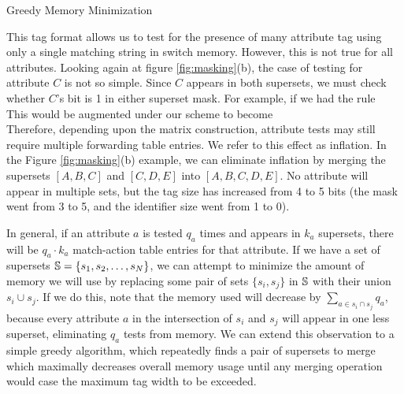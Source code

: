 \begin{algorithm}
\DontPrintSemicolon
{}
\caption{Greedy Memory Minimization\label{alg:memory_min}}
\end{algorithm}




This tag format allows us to test for the presence of many attribute tag using
only a single matching string in switch memory.  However, this is not true for
all attributes. Looking again at figure \ref{fig:masking}(b), the case of
testing for attribute $C$ is not so simple. Since $C$ appears in both supersets,
we must check whether $C$'s bit is 1 in either superset mask. For example, if we
had the rule\\ 
This would be augmented under our scheme to
become\\ 
Therefore, depending upon the matrix
construction, attribute tests may still require multiple forwarding table
entries. We refer to this effect as inflation. In the Figure
\ref{fig:masking}(b) example, we can eliminate inflation by merging the
supersets $[A,B,C]$ and $[C,D,E]$ into $[A,B,C,D,E]$. No attribute will appear
in multiple sets, but the tag size has increased from 4 to 5 bits (the mask went
from 3 to 5, and the identifier size went from 1 to 0).

In general, if an attribute $a$ is tested $q_a$ times and appears in $k_a$
supersets, there will be $q_a\cdot k_a$ match-action table entries for that
attribute. If we have a set of supersets $\mathbb{S} = \{s_1, s_2, \dots, s_N\}$, we
can attempt to minimize the amount of memory we will use by replacing some pair
of sets $\{s_i, s_j\}$ in $\mathbb{S}$ with their union $s_i\cup s_j$. If we do this,
note that the memory used will decrease by $\sum_{a \in s_i\cap s_j}q_a$,
because every attribute $a$ in the intersection of $s_i$ and $s_j$ will appear
in one less superset, eliminating $q_a$ tests from memory. We can extend this
observation to a simple greedy algorithm, which repeatedly finds a pair of
supersets to merge which maximally decreases overall memory usage until any
merging operation would case the maximum tag width to be exceeded. 


